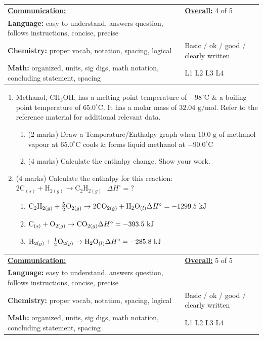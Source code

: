 \documentclass[11pt]{article}
\newcommand{\testheader}[1]{
\noindent
\begin{tabularx}{\textwidth}{|X|m{4.5cm}|}
\hline
\textbf{\underline{Communication:}} & \textbf{\underline{Overall:}} \hfill #1 of 5 \\
\textbf{Language:} easy to understand, answers question, follows instructions, concise, precise & \\
\textbf{Chemistry:} proper vocab, notation, spacing, logical & Basic / ok / good / clearly written \\
\textbf{Math:} organized, units, sig digs, math notation, concluding statement, spacing & \space\space L1 \space\space L2 \space\space L3 \space\space\space\space\space L4 \\
\hline
\end{tabularx}
\vspace{0.4cm}
}
\begin{document}
\vfill

\newpage

\testheader{4}

\begin{enumerate}[leftmargin=*, label=\arabic*., start=7]
    \item Methanol, $\text{CH}_3\text{OH}$, has a melting point temperature of $-98^\circ\text{C}$ \& a boiling point temperature of $65.0^\circ\text{C}$. It has a molar mass of $32.04\text{ g/mol}$. Refer to the reference material for additional relevant data.
    \begin{enumerate}[label=\alph*.)]
        \item (2 marks) Draw a Temperature/Enthalpy graph when $10.0\text{ g}$ of methanol vapour at $65.0^\circ\text{C}$ cools \& forms liquid methanol at $-90.0^\circ\text{C}$
        \vspace{5cm}
        \item (4 marks) Calculate the enthalpy change. Show your work.
        \vspace{4.5cm}
    \end{enumerate}

    \item (4 marks) Calculate the enthalpy for this reaction: $2\text{C}_{(s)} + \text{H}_{2(g)} \rightarrow \text{C}_2\text{H}_{2(g)} \text{ } \Delta H^\circ=?$
    \vspace{0.3cm}
    
    \begin{enumerate}[label=(\roman*)]
        \item $\text{C}_2\text{H}_{2(g)} + \frac{5}{2}\text{O}_{2(g)} \rightarrow 2\text{CO}_{2(g)} + \text{H}_2\text{O}_{(l)} \hfill \Delta H^\circ = -1299.5\text{ kJ}$
        \item $\text{C}_{(s)} + \text{O}_{2(g)} \rightarrow \text{CO}_{2(g)} \hfill \Delta H^\circ = -393.5\text{ kJ}$
        \item $\text{H}_{2(g)} + \frac{1}{2}\text{O}_{2(g)} \rightarrow \text{H}_2\text{O}_{(l)} \hfill \Delta H^\circ = -285.8\text{ kJ}$
    \end{enumerate}
\end{enumerate}

\vfill

\newpage

\testheader{5}
\end{document}
